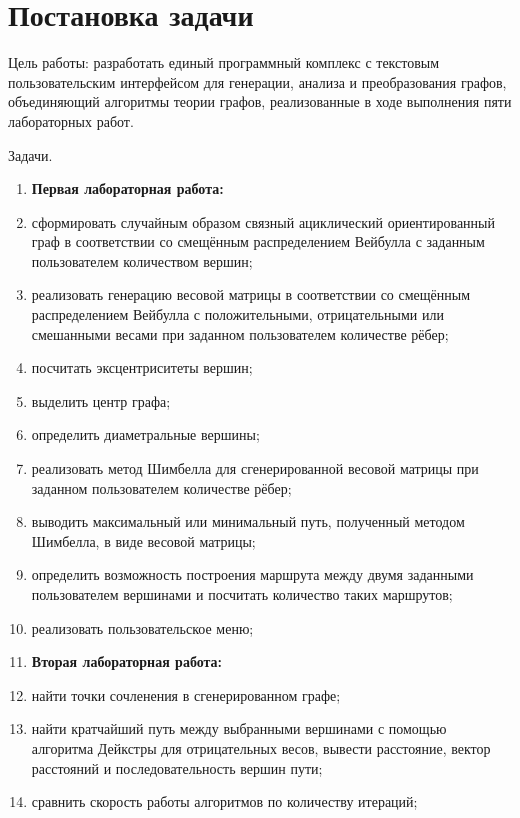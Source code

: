 \section{Постановка задачи}

Цель работы: разработать единый программный комплекс с текстовым пользовательским интерфейсом для генерации, анализа и преобразования графов, объединяющий алгоритмы теории графов, реализованные в ходе выполнения пяти лабораторных работ.

Задачи.
\begin{enumerate}
    \vspace{1em}
    \item[] \textbf{Первая лабораторная работа:}
    \item сформировать случайным образом связный ациклический ориентированный граф в соответствии со смещённым распределением Вейбулла с заданным пользователем количеством вершин;
    \item реализовать генерацию весовой матрицы в соответствии со смещённым распределением Вейбулла с положительными, отрицательными или смешанными весами при заданном пользователем количестве рёбер;
    \item посчитать эксцентриситеты вершин;
    \item выделить центр графа;
    \item определить диаметральные вершины;
    \item реализовать метод Шимбелла для сгенерированной весовой матрицы при заданном пользователем количестве рёбер;
    \item выводить максимальный или минимальный путь, полученный методом Шимбелла, в виде весовой матрицы;
    \item определить возможность построения маршрута между двумя заданными пользователем вершинами и посчитать количество таких маршрутов;
    \item реализовать пользовательское меню;

    \vspace{1em}
    \item[] \textbf{Вторая лабораторная работа:}
    \item найти точки сочленения в сгенерированном графе;
    \item найти кратчайший путь между выбранными вершинами с помощью алгоритма Дейкстры для отрицательных весов, вывести расстояние, вектор расстояний и последовательность вершин пути;
    \item сравнить скорость работы алгоритмов по количеству итераций;


\end{enumerate}
